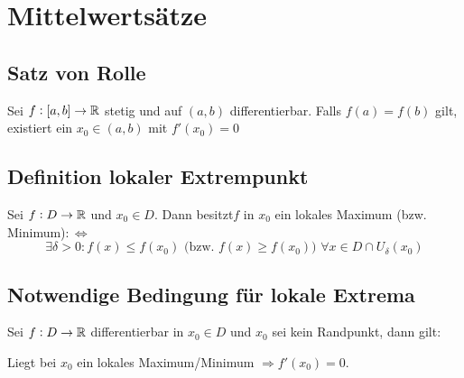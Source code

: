 \section{Mittelwertsätze}

\subsection{Satz von Rolle}
Sei $f: [a, b] \rightarrow \mathbb{R}$ stetig und auf $(a,b)$ differentierbar. Falls
$f(a) = f(b)$ gilt, existiert ein $x_0 \in (a,b)$ mit $f'(x_0)=0$

\subsection{Definition lokaler Extrempunkt}
Sei $f: D \rightarrow \mathbb{R}$ und $x_0 \in D$. Dann besitzt$f$ in $x_0$ ein
lokales Maximum (bzw. Minimum)$:\Leftrightarrow$
\begin{equation*}
    \exists \delta > 0: f(x) \leq f(x_0)
    \text{ (bzw. } f(x) \geq f(x_0) \text{) } \forall x \in D \cap U_\delta(x_0)
\end{equation*}

\subsection{Notwendige Bedingung für lokale Extrema}
Sei $f: D \rightarrow \mathbb{R}$ differentierbar in $x_0 \in D$ und $x_0$ sei kein
Randpunkt, dann gilt:

Liegt bei $x_0$ ein lokales Maximum/Minimum $\Rightarrow f'(x_0)=0$.
